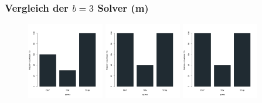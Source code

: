 \documentclass{beamer}
\begin{document}
\begin{frame}
\frametitle{Vergleich der $b = 3$ Solver (m)}

\begin{figure}
\centering
\includegraphics[width=0.3\textwidth]{images/solver_instance_coverage_b=3_m_600s.png}
\includegraphics[width=0.3\textwidth]{images/solver_instance_coverage_b=3_m_1200s.png}
\includegraphics[width=0.3\textwidth]{images/solver_instance_coverage_b=3_m_1800s.png}
\caption*{\textsc{Zeitlimit} $10min$ $\quad\quad\quad$ \textsc{Zeitlimit} $20min$ $\quad\quad\quad$ \textsc{Zeitlimit} $30min$}
\begin{subfigure}[b]{0.3\textwidth}
\centering
{}
\end{subfigure}
\end{figure}
\end{frame}
\end{document}
